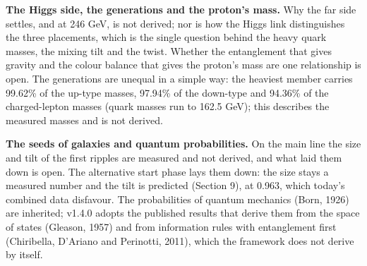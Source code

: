 \documentclass[
  11pt,
]{article}
\begin{document}
\textbf{The Higgs side, the generations and the proton's mass.} Why the far side settles, and at 246 GeV, is not derived; nor is how the Higgs link distinguishes the three placements, which is the single question behind the heavy quark masses, the mixing tilt and the twist. Whether the entanglement that gives gravity and the colour balance that gives the proton's mass are one relationship is open. The generations are unequal in a simple way: the heaviest member carries 99.62\% of the up-type masses, 97.94\% of the down-type and 94.36\% of the charged-lepton masses (quark masses run to 162.5 GeV); this describes the measured masses and is not derived.

\textbf{The seeds of galaxies and quantum probabilities.} On the main line the size and tilt of the first ripples are measured and not derived, and what laid them down is open. The alternative start phase lays them down: the size stays a measured number and the tilt is predicted (Section 9), at 0.963, which today's combined data disfavour. The probabilities of quantum mechanics (Born, 1926) are inherited; v1.4.0 adopts the published results that derive them from the space of states (Gleason, 1957) and from information rules with entanglement first (Chiribella, D'Ariano and Perinotti, 2011), which the framework does not derive by itself.
\end{document}

